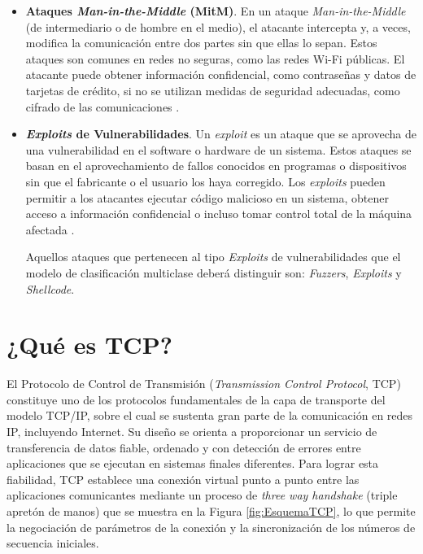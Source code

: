 \begin{itemize}
\item{\textbf{Ataques \textit{Man-in-the-Middle} (MitM)}}.
En un ataque \textit{Man-in-the-Middle} (de intermediario o de hombre en el medio), el atacante intercepta y, a veces, modifica la comunicación entre dos partes sin que ellas lo sepan. Estos ataques son comunes en redes no seguras, como las redes Wi-Fi públicas. El atacante puede obtener información confidencial, como contraseñas y datos de tarjetas de crédito, si no se utilizan medidas de seguridad adecuadas, como cifrado de las comunicaciones \cite{tanenbaum2009}.

\item{\textbf{\textit{Exploits} de Vulnerabilidades}}.
Un \textit{exploit} es un ataque que se aprovecha de una vulnerabilidad en el software o hardware de un sistema. Estos ataques se basan en el aprovechamiento de fallos conocidos en programas o dispositivos sin que el fabricante o el usuario los haya corregido. Los \textit{exploits} pueden permitir a los atacantes ejecutar código malicioso en un sistema, obtener acceso a información confidencial o incluso tomar control total de la máquina afectada \cite{cissp2018}.

Aquellos ataques que pertenecen al tipo \textit{Exploits} de vulnerabilidades que el modelo de clasificación multiclase deberá distinguir son: \textit{Fuzzers}, \textit{Exploits} y \textit{Shellcode}.

\end{itemize}

\section{¿Qué es TCP?}

El Protocolo de Control de Transmisión (\textit{Transmission Control Protocol}, TCP) constituye uno de los protocolos fundamentales de la capa de transporte del modelo TCP/IP, sobre el cual se sustenta gran parte de la comunicación en redes IP, incluyendo Internet. Su diseño se orienta a proporcionar un servicio de transferencia de datos fiable, ordenado y con detección de errores entre aplicaciones que se ejecutan en sistemas finales diferentes. Para lograr esta fiabilidad, TCP establece una conexión virtual punto a punto entre las aplicaciones comunicantes mediante un proceso de \textit{three way handshake} (triple apretón de manos) que se muestra en la Figura \ref{fig:EsquemaTCP}, lo que permite la negociación de parámetros de la conexión y la sincronización de los números de secuencia iniciales.

